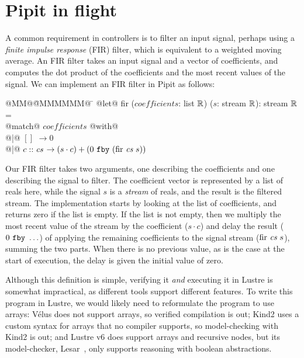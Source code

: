 \documentclass[sigplan,screen]{acmart}
\begin{document}
\section{Pipit in flight}

A common requirement in controllers is to filter an input signal, perhaps using a \emph{finite impulse response} (FIR) filter, which is equivalent to a weighted moving average.
An FIR filter takes an input signal and a vector of coefficients, and computes the dot product of the coefficients and the most recent values of the signal.
We can implement an FIR filter in Pipit as follows:

\begin{tabbing}
  @MM@\= @MMMMMM@ \= \kill
  @let@ fir ($\textit{coefficients}$: list $\mathbb{R}$) ($s$: stream $\mathbb{R}$): stream $\mathbb{R}$ = \\
    \> @match@ $\textit{coefficients}$ @with@ \\
    \> @|@ $[]$ \> $\to 0$ \\
    \> @|@ $c :: \textit{cs} $ \> $\to (s \cdot c) + (0~\texttt{fby}~(\mbox{fir~} \textit{cs}~s))$
\end{tabbing}

Our FIR filter takes two arguments, one describing the coefficients and one describing the signal to filter.
The coefficient vector is represented by a list of reals here, while the signal $s$ is a \emph{stream} of reals, and the result is the filtered stream.
The implementation starts by looking at the list of coefficients, and returns zero if the list is empty.
If the list is not empty, then we multiply the most recent value of the stream by the coefficient ($s \cdot c$) and delay the result ($0~\texttt{fby}~\ldots$) of applying the remaining coefficients to the signal stream ($\mbox{fir~} \textit{cs} ~ s$), summing the two parts.
When there is no previous value, as is the case at the start of execution, the delay is given the initial value of zero.

Although this definition is simple, verifying it \emph{and} executing it in Lustre is somewhat impractical, as different tools support different features.
To write this program in Lustre, we would likely need to reformulate the program to use arrays: Vélus does not support arrays, so verified compilation is out; Kind2 uses a custom syntax for arrays that no compiler supports, so model-checking with Kind2 is out; and Lustre v6 does support arrays and recursive nodes, but its model-checker, Lesar~\cite{raymond2008synchronous}, only supports reasoning with boolean abstractions.
\end{document}
